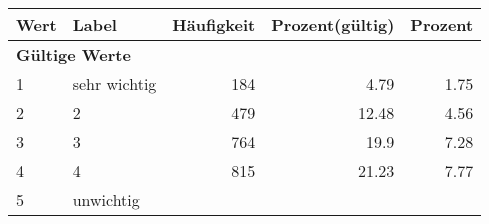      \begin{longtable}{lXrrr}
     \toprule
     \textbf{Wert} & \textbf{Label} & \textbf{Häufigkeit} & \textbf{Prozent(gültig)} & \textbf{Prozent} \\
     \endhead
     \midrule
     \multicolumn{5}{l}{\textbf{Gültige Werte}}\\

     1 &
     \multicolumn{1}{X}{ sehr wichtig   } &


       \num{184} &
       \num[round-mode=places,round-precision=2]{4,79} &
         \num[round-mode=places,round-precision=2]{1,75} \\

     2 &
     \multicolumn{1}{X}{ 2   } &


       \num{479} &
       \num[round-mode=places,round-precision=2]{12,48} &
         \num[round-mode=places,round-precision=2]{4,56} \\

     3 &
     \multicolumn{1}{X}{ 3   } &


       \num{764} &
       \num[round-mode=places,round-precision=2]{19,9} &
         \num[round-mode=places,round-precision=2]{7,28} \\

     4 &
     \multicolumn{1}{X}{ 4   } &


       \num{815} &
       \num[round-mode=places,round-precision=2]{21,23} &
         \num[round-mode=places,round-precision=2]{7,77} \\

     5 &
     \multicolumn{1}{X}{ unwichtig   } &



\end{longtable}
